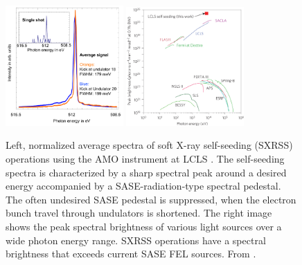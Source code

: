 \begin{figure}
	\centering
		\includegraphics[width=0.40\textwidth]{images/Soft-X-ray-self-seeding.pdf}
		\includegraphics[width=0.40\textwidth]{images/spectral-brightness-fletcher-2015.jpg}
	\caption[Soft X-ray self-seeding spectra and brilliance of various lightsources.]{Left, normalized average spectra of soft X-ray self-seeding (SXRSS) operations using the AMO instrument at LCLS \citep[see][]{Bucher-2014-Unpublished}. The self-seeding spectra is characterized by a sharp spectral peak around a desired energy accompanied by a SASE-radiation-type spectral pedestal. The often undesired SASE pedestal is suppressed, when the electron bunch travel through undulators is shortened. The right image shows the peak spectral brightness of various light sources over a wide photon energy range. SXRSS operations have a spectral brightness that exceeds current SASE FEL sources. From \citep{Fletcher-2015-NatPho}.}
	\label{fig:soft-xray-self-seeding}
\end{figure}
%
